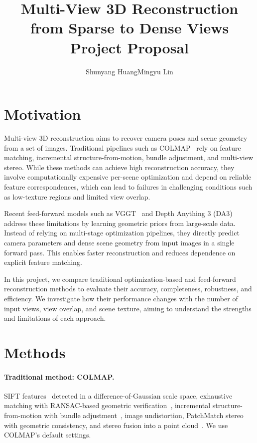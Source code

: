 \documentclass[10pt,twocolumn,letterpaper]{article}
\title{Multi-View 3D Reconstruction from Sparse to Dense Views\\[2pt]
\large Project Proposal}
\author{Shunyang Huang\qquad Mingyu Lin}
\begin{document}
\maketitle

\section{Motivation}

Multi-view 3D reconstruction aims to recover camera poses and scene geometry from a set of images. Traditional pipelines such as COLMAP~\cite{schonberger2016sfm,schonberger2016mvs} rely on feature matching, incremental structure-from-motion, bundle adjustment, and multi-view stereo. While these methods can achieve high reconstruction accuracy, they involve computationally expensive per-scene optimization and depend on reliable feature correspondences, which can lead to failures in challenging conditions such as low-texture regions and limited view overlap.

Recent feed-forward models such as VGGT~\cite{wang2025vggt} and Depth Anything 3 (DA3)~\cite{lin2025da3} address these limitations by learning geometric priors from large-scale data. Instead of relying on multi-stage optimization pipelines, they directly predict camera parameters and dense scene geometry from input images in a single forward pass. This enables faster reconstruction and reduces dependence on explicit feature matching.

In this project, we compare traditional optimization-based and feed-forward reconstruction methods to evaluate their accuracy, completeness, robustness, and efficiency. We investigate how their performance changes with the number of input views, view overlap, and scene texture, aiming to understand the strengths and limitations of each approach.

\section{Methods}

\paragraph{Traditional method: COLMAP.}
SIFT features~\cite{lowe2004sift} detected in a difference-of-Gaussian scale space, exhaustive matching with
RANSAC-based geometric verification~\cite{fischler1981ransac}, incremental structure-from-motion with bundle
adjustment~\cite{schonberger2016sfm}, image undistortion, PatchMatch stereo with geometric consistency, and
stereo fusion into a point cloud~\cite{schonberger2016mvs}. We use COLMAP's default settings.
\end{document}
